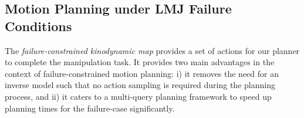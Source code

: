 \subsection{Motion Planning under LMJ Failure Conditions}\label{sec:methods-planning}

The \textsl{failure-constrained kinodynamic map} provides a set of actions for our planner to complete the manipulation task. It provides two main advantages in the context of failure-constrained motion planning: i) it removes the need for an inverse model such that no action sampling is required during the planning process, and ii) it caters to a multi-query planning framework to speed up planning times for the failure-case significantly. 










